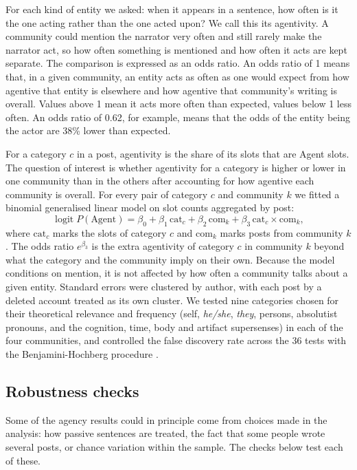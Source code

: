 \documentclass[11pt,a4paper]{article}
\begin{document}
For each kind of entity we asked: when it appears in a sentence, how often is it the one acting rather than the one acted upon? We call this its agentivity. A community could mention the narrator very often and still rarely make the narrator act, so how often something is mentioned and how often it acts are kept separate. The comparison is expressed as an odds ratio. An odds ratio of 1 means that, in a given community, an entity acts as often as one would expect from how agentive that entity is elsewhere and how agentive that community's writing is overall. Values above 1 mean it acts more often than expected, values below 1 less often. An odds ratio of 0.62, for example, means that the odds of the entity being the actor are 38\% lower than expected.

For a category $c$ in a post, agentivity is the share of its slots that are Agent slots. The question of interest is whether agentivity for a category is higher or lower in one community than in the others after accounting for how agentive each community is overall. For every pair of category $c$ and community $k$ we fitted a binomial generalised linear model on slot counts aggregated by post:
\begin{equation}
\operatorname{logit} P(\text{Agent}) = \beta_0 + \beta_1\,\mathrm{cat}_c + \beta_2\,\mathrm{com}_k + \beta_3\,\mathrm{cat}_c \times \mathrm{com}_k ,
\end{equation}
where $\mathrm{cat}_c$ marks the slots of category $c$ and $\mathrm{com}_k$ marks posts from community $k$. The odds ratio $e^{\beta_3}$ is the extra agentivity of category $c$ in community $k$ beyond what the category and the community imply on their own. Because the model conditions on mention, it is not affected by how often a community talks about a given entity. Standard errors were clustered by author, with each post by a deleted account treated as its own cluster. We tested nine categories chosen for their theoretical relevance and frequency (self, \textit{he/she}, \textit{they}, persons, absolutist pronouns, and the cognition, time, body and artifact supersenses) in each of the four communities, and controlled the false discovery rate across the 36 tests with the Benjamini-Hochberg procedure \citep{benjamini1995}.

\subsection{Robustness checks}\label{sec:robust}

Some of the agency results could in principle come from choices made in the analysis: how passive sentences are treated, the fact that some people wrote several posts, or chance variation within the sample. The checks below test each of these.
\end{document}
